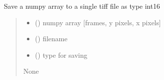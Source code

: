 \documentclass[letterpaper,10pt,english]{sphinxmanual}
\begin{document}
\begin{fulllineitems}
\label{\detokenize{IO:IO.save_single_tiff}}
\pysigstartsignatures
{}
\pysigstopsignatures
\sphinxAtStartPar
Save a numpy array to a single tiff file as type int16
\begin{quote}\begin{description}
\begin{itemize}
\item {} 
\sphinxAtStartPar
{} () \textendash{} numpy array {[}frames, y pixels, x pixels{]}

\item {} 
\sphinxAtStartPar
{} () \textendash{} filename

\item {} 
\sphinxAtStartPar
{} (\sphinxstyleliteralemphasis{\sphinxupquote{{[}}}\sphinxstyleliteralemphasis{\sphinxupquote{{]}}}) \textendash{} type for saving

\end{itemize}

\sphinxAtStartPar
None

\end{description}\end{quote}

\end{fulllineitems}

\end{document}
